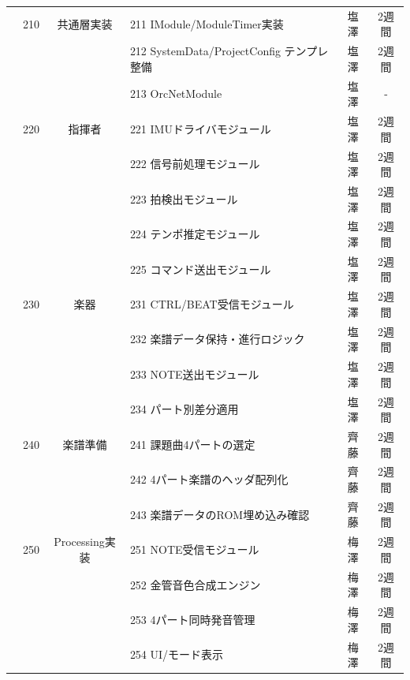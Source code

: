 \documentclass[lualatex,book,paper=a4paper,jafontsize=11.5pt,jafontscale=1.05]{jlreq}
\begin{document}
\begin{table}[H]
\begin{tabular}{|c|c|c|p{5cm}|c|c|}
& 210 & 共通層実装 & 211 IModule/ModuleTimer実装 & 塩澤 & 2週間 \\ 
& & & 212 SystemData/ProjectConfig テンプレ整備 & 塩澤 & 2週間 \\ 
& & & 213 OrcNetModule & 塩澤 & - \\ 
& 220 & 指揮者 & 221 IMUドライバモジュール & 塩澤 & 2週間 \\ 
& & & 222 信号前処理モジュール & 塩澤 & 2週間 \\ 
& & & 223 拍検出モジュール & 塩澤 & 2週間 \\ 
& & & 224 テンポ推定モジュール & 塩澤 & 2週間 \\ 
& & & 225 コマンド送出モジュール & 塩澤 & 2週間 \\ 
& 230 & 楽器 & 231 CTRL/BEAT受信モジュール & 塩澤 & 2週間 \\ 
& & & 232 楽譜データ保持・進行ロジック & 塩澤 & 2週間 \\ 
& & & 233 NOTE送出モジュール & 塩澤 & 2週間\\ 
& & & 234 パート別差分適用 & 塩澤 & 2週間 \\ 
& 240 & 楽譜準備 & 241 課題曲4パートの選定 & 齊藤 & 2週間 \\ 
& & & 242 4パート楽譜のヘッダ配列化 & 齊藤 & 2週間 \\ 
& & & 243 楽譜データのROM埋め込み確認 & 齊藤 & 2週間 \\ 
& 250 & Processing実装 & 251 NOTE受信モジュール & 梅澤 & 2週間 \\ 
& & & 252 金管音色合成エンジン & 梅澤 & 2週間 \\ 
& & & 253 4パート同時発音管理 & 梅澤 & 2週間 \\ 
& & & 254 UI/モード表示 & 梅澤 & 2週間 \\ \hline

\end{tabular}
\end{table}
\end{document}
